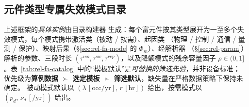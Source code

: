 \subsection{元件类型专属失效模式目录}\label{sec:rel-fa-catalog}
上述框架的\emph{具体实例}由目录构建器 
生成：每个富元件按其类型展开为一至多个失效模式，每个模式携带激活类（被动 / 按需）、起因类
（物理 / 控制 / 通信 / 量测 / 保护）、映射后果（\S\ref{sec:rel-fa-mode} 的 $\Phi_m$）、经解析器
（\S\ref{sec:rel-param}）解析的参数、三段时长 $(\tau^{iso},\tau^{sw},\tau^{rep})$，以及降额模式的残余容量因子
$\rho\in(0,1]$。表~\ref{tab:rel-fa-catalog} 中的“模板默认”是\emph{可替换的筛选先验}，并非设备标准；
优先级为\textbf{算例数据 $\succ$ 选定模板 $\succ$ 筛选默认}，缺失量在严格数据策略下保持未确定。
被动模式默认以 $(\lambda\,[\text{occ/yr}],\,r\,[\text{hr}])$ 给出，按需模式以
$(p_d,\,\nu_d\,[/\text{yr}])$ 给出。
